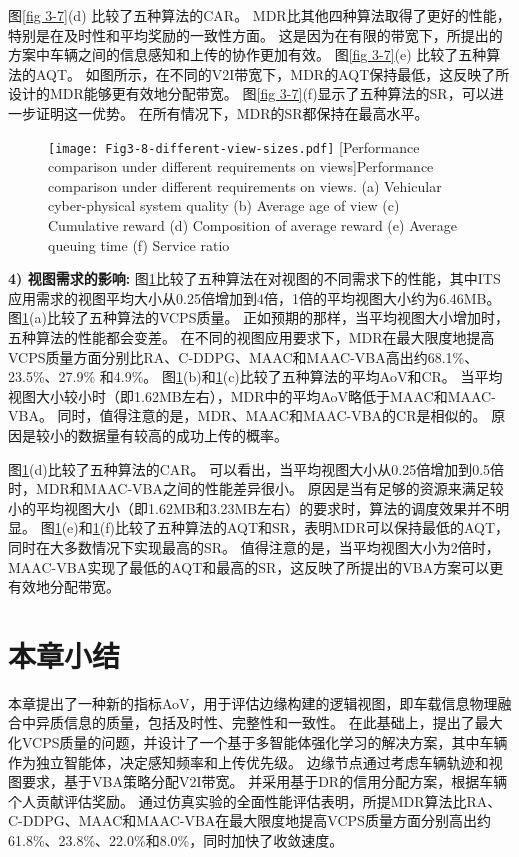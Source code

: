 图\ref{fig 3-7}(d) 比较了五种算法的CAR。
MDR比其他四种算法取得了更好的性能，特别是在及时性和平均奖励的一致性方面。
这是因为在有限的带宽下，所提出的方案中车辆之间的信息感知和上传的协作更加有效。
图\ref{fig 3-7}(e) 比较了五种算法的AQT。
如图所示，在不同的V2I带宽下，MDR的AQT保持最低，这反映了所设计的MDR能够更有效地分配带宽。
图\ref{fig 3-7}(f)显示了五种算法的SR，可以进一步证明这一优势。
在所有情况下，MDR的SR都保持在最高水平。


\begin{figure}[h]
  \centering
  \texttt{[image: Fig3-8-different-view-sizes.pdf]}
  [Performance comparison under different requirements on views]{Performance comparison under different requirements on views. (a) Vehicular cyber-physical system quality (b) Average age of view (c) Cumulative reward (d) Composition of average reward (e) Average queuing time (f) Service ratio}
  \label{fig 3-8}
\end{figure}

\textbf{4) 视图需求的影响:}
图\ref{fig 3-8}比较了五种算法在对视图的不同需求下的性能，其中ITS应用需求的视图平均大小从0.25倍增加到4倍，1倍的平均视图大小约为6.46MB。
图\ref{fig 3-8}(a)比较了五种算法的VCPS质量。
正如预期的那样，当平均视图大小增加时，五种算法的性能都会变差。
在不同的视图应用要求下，MDR在最大限度地提高VCPS质量方面分别比RA、C-DDPG、MAAC和MAAC-VBA高出约68.1\%、23.5\%、27.9\% 和4.9\%。
图\ref{fig 3-8}(b)和\ref{fig 3-8}(c)比较了五种算法的平均AoV和CR。
当平均视图大小较小时（即1.62MB左右），MDR中的平均AoV略低于MAAC和MAAC-VBA。
同时，值得注意的是，MDR、MAAC和MAAC-VBA的CR是相似的。
原因是较小的数据量有较高的成功上传的概率。

图\ref{fig 3-8}(d)比较了五种算法的CAR。
可以看出，当平均视图大小从0.25倍增加到0.5倍时，MDR和MAAC-VBA之间的性能差异很小。
原因是当有足够的资源来满足较小的平均视图大小（即1.62MB和3.23MB左右）的要求时，算法的调度效果并不明显。
图\ref{fig 3-8}(e)和\ref{fig 3-8}(f)比较了五种算法的AQT和SR，表明MDR可以保持最低的AQT，同时在大多数情况下实现最高的SR。
值得注意的是，当平均视图大小为2倍时，MAAC-VBA实现了最低的AQT和最高的SR，这反映了所提出的VBA方案可以更有效地分配带宽。

\section{本章小结}\label{section 3-6}

本章提出了一种新的指标AoV，用于评估边缘构建的逻辑视图，即车载信息物理融合中异质信息的质量，包括及时性、完整性和一致性。
在此基础上，提出了最大化VCPS质量的问题，并设计了一个基于多智能体强化学习的解决方案，其中车辆作为独立智能体，决定感知频率和上传优先级。
边缘节点通过考虑车辆轨迹和视图要求，基于VBA策略分配V2I带宽。
并采用基于DR的信用分配方案，根据车辆个人贡献评估奖励。
通过仿真实验的全面性能评估表明，所提MDR算法比RA、C-DDPG、MAAC和MAAC-VBA在最大限度地提高VCPS质量方面分别高出约61.8\%、23.8\%、22.0\%和8.0\%，同时加快了收敛速度。

